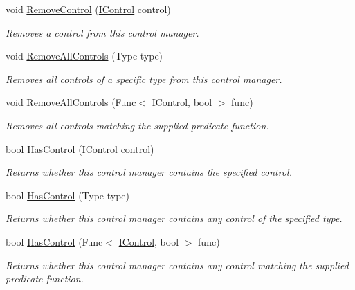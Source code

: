 \begin{DoxyCompactItemize}
void \hyperlink{class_tri_devs_1_1_tri_engine_1_1_u_i_1_1_control_manager_a1ea14477960aee098283c0ac1f295e6f}{Remove\-Control} (\hyperlink{interface_tri_devs_1_1_tri_engine_1_1_u_i_1_1_i_control}{I\-Control} control)
\begin{DoxyCompactList}\small\item\em Removes a control from this control manager. \end{DoxyCompactList}\item 
void \hyperlink{class_tri_devs_1_1_tri_engine_1_1_u_i_1_1_control_manager_a38699c8cba1f875c28e55e6deb56bb82}{Remove\-All\-Controls} (Type type)
\begin{DoxyCompactList}\small\item\em Removes all controls of a specific type from this control manager. \end{DoxyCompactList}\item 
void \hyperlink{class_tri_devs_1_1_tri_engine_1_1_u_i_1_1_control_manager_ace8c2357f94e5e78d495ecb362e86684}{Remove\-All\-Controls} (Func$<$ \hyperlink{interface_tri_devs_1_1_tri_engine_1_1_u_i_1_1_i_control}{I\-Control}, bool $>$ func)
\begin{DoxyCompactList}\small\item\em Removes all controls matching the supplied predicate function. \end{DoxyCompactList}\item 
bool \hyperlink{class_tri_devs_1_1_tri_engine_1_1_u_i_1_1_control_manager_a6f14e9b2218648c1ca0b1abe4bba53e4}{Has\-Control} (\hyperlink{interface_tri_devs_1_1_tri_engine_1_1_u_i_1_1_i_control}{I\-Control} control)
\begin{DoxyCompactList}\small\item\em Returns whether this control manager contains the specified control. \end{DoxyCompactList}\item 
bool \hyperlink{class_tri_devs_1_1_tri_engine_1_1_u_i_1_1_control_manager_a85655f6e42bb130ca4f86328c0b06bd0}{Has\-Control} (Type type)
\begin{DoxyCompactList}\small\item\em Returns whether this control manager contains any control of the specified type. \end{DoxyCompactList}\item 
bool \hyperlink{class_tri_devs_1_1_tri_engine_1_1_u_i_1_1_control_manager_a627a1c2a487dc45108417fb10296a26e}{Has\-Control} (Func$<$ \hyperlink{interface_tri_devs_1_1_tri_engine_1_1_u_i_1_1_i_control}{I\-Control}, bool $>$ func)
\begin{DoxyCompactList}\small\item\em Returns whether this control manager contains any control matching the supplied predicate function. \end{DoxyCompactList}\end{DoxyCompactItemize}
